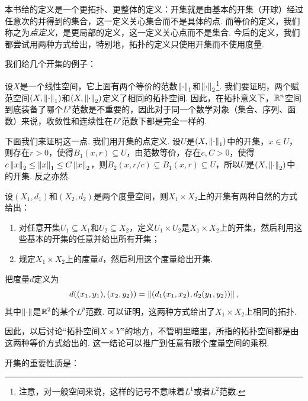 本书给的定义是一个更拓扑、更整体的定义：开集就是由基本的开集（开球）经过任意次的并得到的集合，这一定义关心集合而不是具体的点. 而等价的定义，我们称之为\textit{点定义}，是更局部的定义，这一定义关心点而不是集合. 今后的定义，我们都尝试用两种方式给出，特别地，拓扑的定义只使用开集而不使用度量. 


我们给几个开集的例子：
\begin{example}[范等价拓扑空间]\label{example:lp-topology}
    设$X$是一个线性空间，它上面有两个等价的范数$\left\|\cdot\right\|_1$和$\left\|\cdot\right\|_2$\footnote{注意，对一般空间来说，这样的记号不意味着$L^1$或者$L^2$范数. }. 我们要证明，两个赋范空间$(X,\left\|\cdot\right\|_1)$和$(X,\left\|\cdot\right\|_2)$定义了相同的拓扑空间. 因此，在拓扑意义下，$\mathbb{R}^n$空间到底装备了哪个$L^p$范数是不重要的，因此对于同一个数学对象（集合、序列、函数）来说，收敛性和连续性在$L^p$范数下都是完全一样的. 

    下面我们来证明这一点. 我们用开集的点定义. 设$U$是$(X,\left\|\cdot\right\|_1)$中的开集，$x\in U$，则存在$r>0$，使得$B_1(x,r)\subseteq U$，由范数等价，存在$c,C>0$，使得$c\left\|x\right\|_2\leq \left\|x\right\|_1\leq C\left\|x\right\|_2$，则$B_2(x,r/c)\subseteq B_1(x,r)\subseteq U$，所以$U$是$(X,\left\|\cdot\right\|_2)$中的开集. 反之亦然. 
\end{example}

\begin{example}[乘积拓扑空间]\label{example:product-topology}
    设$(X_1,d_1)$和$(X_2,d_2)$是两个度量空间，则$X_1\times X_2$上的开集有两种自然的方式给出：
    \begin{enumerate}
        \item 对任意开集$U_1\subseteq X_1$和$U_2\subseteq X_2$，定义$U_1\times U_2$是$X_1\times X_2$上的开集，然后利用这些基本的开集的任意并给出所有开集；
        \item 规定$X_1\times X_2$上的度量$d$，然后利用这个度量给出开集. 
    \end{enumerate}

    把度量$d$定义为
    \[d((x_1,y_1),(x_2,y_2))=\left\|(d_1(x_1,x_2),d_2(y_1,y_2))\right\|,\]
    其中$\left\|\cdot\right\|$是$\mathbb{R}^2$的某个$L^p$范数. 可以证明，这两种方式给出了$X_1\times X_2$上相同的拓扑. 
    
    因此，以后讨论“拓扑空间$X\times Y$”的地方，不管明里暗里，所指的拓扑空间都是由这两种等价方式给出的. 这一结论可以推广到任意有限个度量空间的乘积. 
\end{example}

开集的重要性质是：

